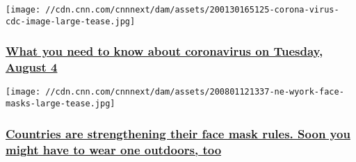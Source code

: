 \href{/2020/08/04/world/coronavirus-newsletter-08-04-20-intl/index.html}{}

\texttt{[image: //cdn.cnn.com/cnnnext/dam/assets/200130165125-corona-virus-cdc-image-large-tease.jpg]}

\hypertarget{what-you-need-to-know-about-coronavirus-on-tuesday-august-4}{%
\subsubsection{\texorpdfstring{\href{/2020/08/04/world/coronavirus-newsletter-08-04-20-intl/index.html}{What
you need to know about coronavirus on Tuesday, August
4}}{What you need to know about coronavirus on Tuesday, August 4}}\label{what-you-need-to-know-about-coronavirus-on-tuesday-august-4}}

\href{/2020/08/04/europe/face-masks-outdoors-rules-intl/index.html}{}

\texttt{[image: //cdn.cnn.com/cnnnext/dam/assets/200801121337-ne-wyork-face-masks-large-tease.jpg]}

\hypertarget{countries-are-strengthening-their-face-mask-rules-soon-you-might-have-to-wear-one-outdoors-too}{%
\subsubsection{\texorpdfstring{\href{/2020/08/04/europe/face-masks-outdoors-rules-intl/index.html}{Countries
are strengthening their face mask rules. Soon you might have to wear one
outdoors,
too}}{Countries are strengthening their face mask rules. Soon you might have to wear one outdoors, too}}\label{countries-are-strengthening-their-face-mask-rules-soon-you-might-have-to-wear-one-outdoors-too}}

